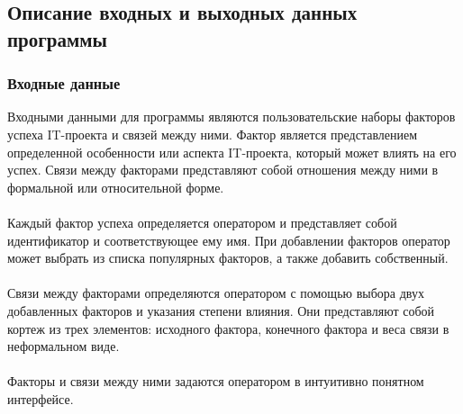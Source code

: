 \documentclass{article}
\begin{document}
    \subsection {Описание входных и выходных данных программы}
    \subsubsection{Входные данные}
    Входными данными для программы являются пользовательские наборы факторов успеха IT-проекта и связей между ними. Фактор является представлением определенной особенности или аспекта IT-проекта, который может влиять на его успех. Связи между факторами представляют собой отношения между ними в формальной или относительной форме.\\
    ~\\
    Каждый фактор успеха определяется оператором и представляет собой идентификатор и соответствующее ему имя. При добавлении факторов оператор может выбрать из списка популярных факторов, а также добавить собственный.\\
    ~\\
    Связи между факторами определяются оператором с помощью выбора двух добавленных факторов и указания степени влияния. Они представляют собой кортеж из трех элементов: исходного фактора, конечного фактора и веса связи в неформальном виде.\\
    ~\\
    Факторы и связи между ними задаются оператором в интуитивно понятном интерфейсе.
\end{document}
